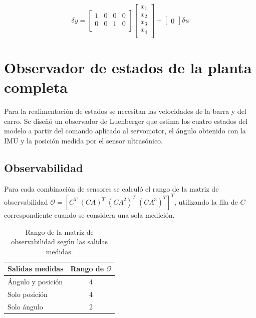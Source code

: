 \documentclass[a4paper, twoside, 10pt, spanish]{article}
\numberwithin{table}{section}
\begin{document}
\begin{equation}
    \delta y
    =
    \begin{bmatrix}
        1 & 0 & 0 & 0\\
        0 & 0 & 1 & 0\\
    \end{bmatrix}
    \begin{bmatrix}
        x_1 \\ x_2 \\ x_3 \\ x_4\\
    \end{bmatrix}
    +
    \begin{bmatrix}
        0
    \end{bmatrix} \delta u
\end{equation}

\section{Observador de estados de la planta completa}
\label{sec:observador-completo}

Para la realimentación de estados se necesitan las velocidades de la barra y del carro. Se diseñó un observador de Luenberger que estima los cuatro estados del modelo a partir del comando aplicado al servomotor, el ángulo obtenido con la IMU y la posición medida por el sensor ultrasónico.

\subsection{Observabilidad}

Para cada combinación de sensores se calculó el rango de la matriz de observabilidad $\mathcal{O} = [C^T \; (CA)^T \; (CA^2)^T \; (CA^3)^T]^T$, utilizando la fila de $C$ correspondiente cuando se considera una sola medición.

\begin{table}[H]
    \centering
    \begin{tabular}{lc}
        \hline
        Salidas medidas & Rango de $\mathcal{O}$ \\
        \hline
        Ángulo y posición & 4 \\
        Solo posición & 4 \\
        Solo ángulo & 2 \\
        \hline
    \end{tabular}
    \caption{Rango de la matriz de observabilidad según las salidas medidas.}
    \label{tab:observabilidad-planta-completa}
\end{table}
\end{document}
